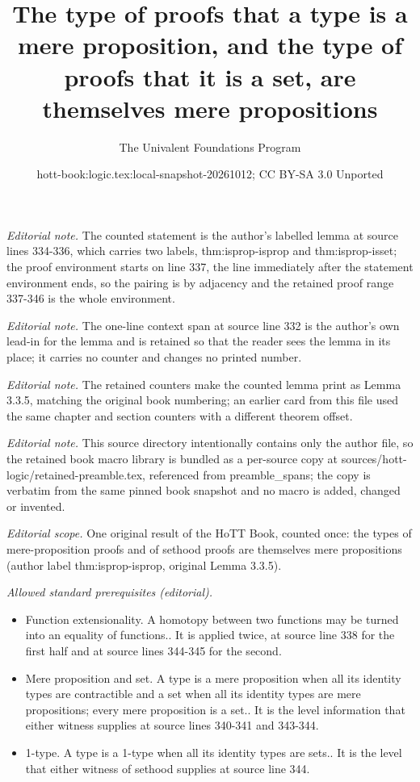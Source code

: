 \documentclass[10pt,a4paper]{article}
\title{The type of proofs that a type is a mere proposition, and the type of proofs that it is a set, are themselves mere propositions}
\author{The Univalent Foundations Program}
\date{hott-book:logic.tex:local-snapshot-20261012; CC BY-SA 3.0 Unported}
\newcounter{chapter}
\theoremstyle{definition}
\theoremstyle{remark}
\numberwithin{equation}{section}
\begin{document}
\maketitle
\setcounter{chapter}{3}
\setcounter{section}{3}
\setcounter{thm}{4}
\noindent\textit{Editorial note.} The counted statement is the author's labelled lemma at source lines 334-336, which carries two labels, thm:isprop-isprop and thm:isprop-isset; the proof environment starts on line 337, the line immediately after the statement environment ends, so the pairing is by adjacency and the retained proof range 337-346 is the whole environment.\par\medskip
\noindent\textit{Editorial note.} The one-line context span at source line 332 is the author's own lead-in for the lemma and is retained so that the reader sees the lemma in its place; it carries no counter and changes no printed number.\par\medskip
\noindent\textit{Editorial note.} The retained counters make the counted lemma print as Lemma 3.3.5, matching the original book numbering; an earlier card from this file used the same chapter and section counters with a different theorem offset.\par\medskip
\noindent\textit{Editorial note.} This source directory intentionally contains only the author file, so the retained book macro library is bundled as a per-source copy at sources/hott-logic/retained-preamble.tex, referenced from preamble\_spans; the copy is verbatim from the same pinned book snapshot and no macro is added, changed or invented.\par\medskip
\noindent\textit{Editorial scope.} One original result of the HoTT Book, counted once: the types of mere-proposition proofs and of sethood proofs are themselves mere propositions (author label thm:isprop-isprop, original Lemma 3.3.5).\par\medskip
\noindent\textit{Allowed standard prerequisites (editorial).}\begin{itemize}
\item Function extensionality. A homotopy between two functions may be turned into an equality of functions.. It is applied twice, at source line 338 for the first half and at source lines 344-345 for the second.
\item Mere proposition and set. A type is a mere proposition when all its identity types are contractible and a set when all its identity types are mere propositions; every mere proposition is a set.. It is the level information that either witness supplies at source lines 340-341 and 343-344.
\item 1-type. A type is a 1-type when all its identity types are sets.. It is the level that either witness of sethood supplies at source line 344.
\end{itemize}\medskip
\end{document}
